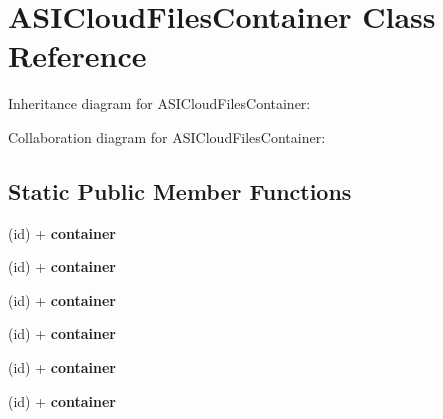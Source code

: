 \hypertarget{interface_a_s_i_cloud_files_container}{
\section{\-A\-S\-I\-Cloud\-Files\-Container \-Class \-Reference}
\label{interface_a_s_i_cloud_files_container}
}


\-Inheritance diagram for \-A\-S\-I\-Cloud\-Files\-Container\-:


\-Collaboration diagram for \-A\-S\-I\-Cloud\-Files\-Container\-:
\subsection*{\-Static \-Public \-Member \-Functions}
\begin{DoxyCompactItemize}
\item 
\hypertarget{interface_a_s_i_cloud_files_container_ab1118d5e936dfd2b2a3af31535b6f05d}{
(id) + {\bfseries container}}
\label{interface_a_s_i_cloud_files_container_ab1118d5e936dfd2b2a3af31535b6f05d}

\item 
\hypertarget{interface_a_s_i_cloud_files_container_ab1118d5e936dfd2b2a3af31535b6f05d}{
(id) + {\bfseries container}}
\label{interface_a_s_i_cloud_files_container_ab1118d5e936dfd2b2a3af31535b6f05d}

\item 
\hypertarget{interface_a_s_i_cloud_files_container_ab1118d5e936dfd2b2a3af31535b6f05d}{
(id) + {\bfseries container}}
\label{interface_a_s_i_cloud_files_container_ab1118d5e936dfd2b2a3af31535b6f05d}

\item 
\hypertarget{interface_a_s_i_cloud_files_container_ab1118d5e936dfd2b2a3af31535b6f05d}{
(id) + {\bfseries container}}
\label{interface_a_s_i_cloud_files_container_ab1118d5e936dfd2b2a3af31535b6f05d}

\item 
\hypertarget{interface_a_s_i_cloud_files_container_ab1118d5e936dfd2b2a3af31535b6f05d}{
(id) + {\bfseries container}}
\label{interface_a_s_i_cloud_files_container_ab1118d5e936dfd2b2a3af31535b6f05d}

\item 
\hypertarget{interface_a_s_i_cloud_files_container_ab1118d5e936dfd2b2a3af31535b6f05d}{
(id) + {\bfseries container}}
\label{interface_a_s_i_cloud_files_container_ab1118d5e936dfd2b2a3af31535b6f05d}


\end{DoxyCompactItemize}
